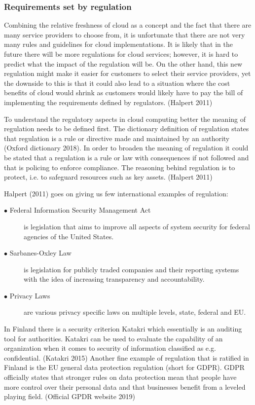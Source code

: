 \documentclass{article}
\begin{document}
\subsubsection{Requirements set by regulation}
Combining the relative freshness of cloud as a concept and the fact that there are many service providers to choose from, it is unfortunate that there are not very many rules and guidelines for cloud implementations.
It is likely that in the future there will be more regulations for cloud services; however, it is hard to predict what the impact of the regulation will be. On the other hand, this new regulation might make it easier for customers to select their service providers, yet the downside to this is that it could also lead to a situation where the cost benefits of cloud would shrink as customers would likely have to pay the bill of implementing the requirements defined by regulators. (Halpert 2011)
\par
To understand the regulatory aspects in cloud computing better the meaning of regulation needs to be defined first.
The dictionary definition of regulation states that regulation is a rule or directive made and maintained by an authority (Oxford dictionary 2018).
In order to broaden the meaning of regulation it could be stated that a regulation is a rule or law with consequences if not followed and that is policing to enforce compliance. The reasoning behind regulation is to protect, i.e. to safeguard resources such as key assets. (Halpert 2011) 
\par
Halpert (2011) goes on giving us few international examples of regulation:
\begin{description}
	\item[$\bullet$ Federal Information Security Management Act] is legislation that aims to improve all aspects of system security for federal agencies of the United States.
	\item[$\bullet$ Sarbanes-Oxley Law] is legislation for publicly traded companies and their reporting systems with the idea of increasing transparency and accountability.
	\item[$\bullet$ Privacy Laws] are various privacy specific laws on multiple levels, state, federal and EU.
\end{description}
In Finland there is a security criterion Katakri which essentially is an auditing tool for authorities. Katakri can be used to evaluate the capability of an organization when it comes to security of information classified as e.g. confidential. (Katakri 2015)
Another fine example of regulation that is ratified in Finland is the EU general data protection regulation (short for GDPR). GDPR officially states that stronger rules on data protection mean that people have more control over their personal data and that businesses benefit from a leveled playing field. (Official GPDR website 2019)
\end{document}
